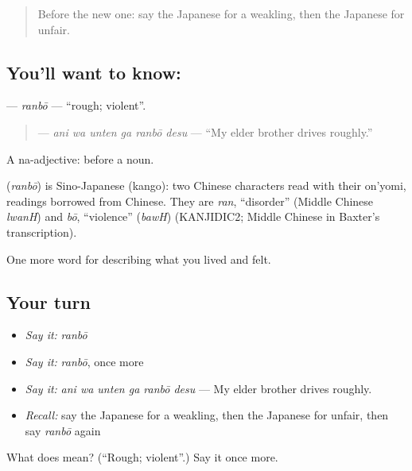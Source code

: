 \begin{quote}
Before the new one: say the Japanese for a weakling, then the Japanese for unfair.
\end{quote}

\subsection*{You'll want to know: }
\textbf{} — \emph{ranbō} — \textquotedblleft{}rough; violent\textquotedblright{}.

\begin{quote}
\textbf{  } — \emph{ani wa unten ga ranbō desu} — \textquotedblleft{}My elder brother drives roughly.\textquotedblright{}
\end{quote}

A na-adjective:  before a noun.

\begin{cousinweb}
\textbf{} (\emph{ranbō}) is Sino-Japanese (kango): two Chinese characters read with their on'yomi, readings borrowed from Chinese. They are \emph{ran}, \textquotedblleft{}disorder\textquotedblright{} (Middle Chinese \emph{lwanH}) and \emph{bō}, \textquotedblleft{}violence\textquotedblright{} (\emph{bawH}) (KANJIDIC2; Middle Chinese in Baxter's transcription).
\end{cousinweb}

\begin{grammarlens}[title={What you've built}]
One more word for describing what you lived and felt.
\end{grammarlens}

\subsection*{Your turn}
\begin{itemize}
\raggedright
  \item \emph{Say it:} \emph{ranbō}
  \item \emph{Say it:} \emph{ranbō}, once more
  \item \emph{Say it:} \emph{ani wa unten ga ranbō desu} — My elder brother drives roughly.
  \item \emph{Recall:} say the Japanese for a weakling, then the Japanese for unfair, then say \emph{ranbō} again
\end{itemize}

\begin{tcolorbox}[breakable,colback=teal!4,colframe=teal!35!black,title={Before you move on}]
What does  mean? (\textquotedblleft{}Rough; violent\textquotedblright{}.) Say it once more.
\end{tcolorbox}
